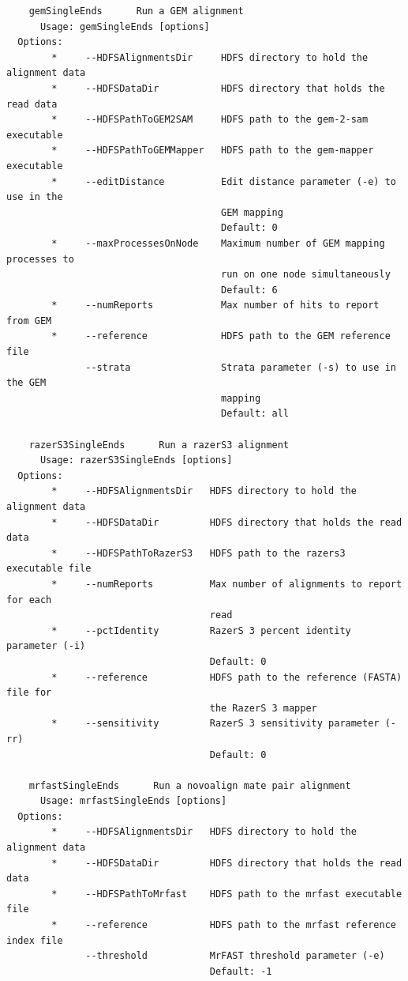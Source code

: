 \documentclass[11pt]{article}
\begin{document}
\begin{verbatim}
    gemSingleEnds      Run a GEM alignment
      Usage: gemSingleEnds [options]
  Options:
        *     --HDFSAlignmentsDir     HDFS directory to hold the alignment data
        *     --HDFSDataDir           HDFS directory that holds the read data
        *     --HDFSPathToGEM2SAM     HDFS path to the gem-2-sam executable
        *     --HDFSPathToGEMMapper   HDFS path to the gem-mapper executable
        *     --editDistance          Edit distance parameter (-e) to use in the
                                      GEM mapping
                                      Default: 0
        *     --maxProcessesOnNode    Maximum number of GEM mapping processes to
                                      run on one node simultaneously
                                      Default: 6
        *     --numReports            Max number of hits to report from GEM
        *     --reference             HDFS path to the GEM reference file
              --strata                Strata parameter (-s) to use in the GEM
                                      mapping
                                      Default: all

    razerS3SingleEnds      Run a razerS3 alignment
      Usage: razerS3SingleEnds [options]
  Options:
        *     --HDFSAlignmentsDir   HDFS directory to hold the alignment data
        *     --HDFSDataDir         HDFS directory that holds the read data
        *     --HDFSPathToRazerS3   HDFS path to the razers3 executable file
        *     --numReports          Max number of alignments to report for each
                                    read
        *     --pctIdentity         RazerS 3 percent identity parameter (-i)
                                    Default: 0
        *     --reference           HDFS path to the reference (FASTA) file for
                                    the RazerS 3 mapper
        *     --sensitivity         RazerS 3 sensitivity parameter (-rr)
                                    Default: 0

    mrfastSingleEnds      Run a novoalign mate pair alignment
      Usage: mrfastSingleEnds [options]
  Options:
        *     --HDFSAlignmentsDir   HDFS directory to hold the alignment data
        *     --HDFSDataDir         HDFS directory that holds the read data
        *     --HDFSPathToMrfast    HDFS path to the mrfast executable file
        *     --reference           HDFS path to the mrfast reference index file
              --threshold           MrFAST threshold parameter (-e)
                                    Default: -1


\end{verbatim}
\end{document}
